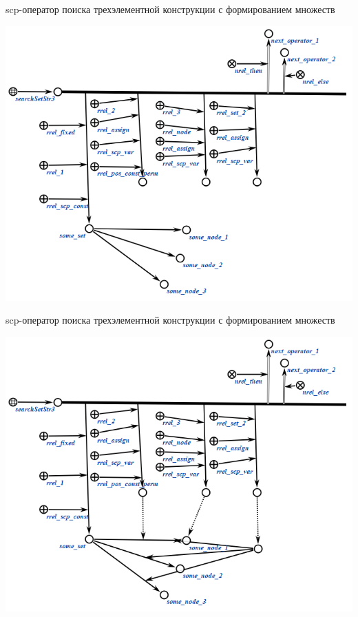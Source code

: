 \begin{frame}{scp-оператор поиска трехэлементной конструкции с формированием множеств}
	\topline
	\justifying
	\vspace{10mm}
	
	\begin{center}
		\includegraphics[scale=0.55]{figures/sd_scp/searchSetStr3_3.png}
	\end{center}
	
\end{frame}

\begin{frame}{scp-оператор поиска трехэлементной конструкции с формированием множеств}
	\topline
	\justifying
	\vspace{10mm}
	
	\begin{center}
		\includegraphics[scale=0.55]{figures/sd_scp/searchSetStr3_4.png}
	\end{center}
	
\end{frame}

